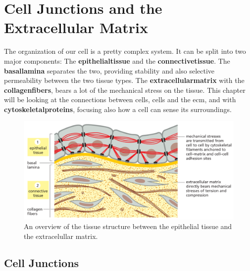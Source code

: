 \documentclass[../main.tex]{subfiles}
\begin{document}
	
\section{Cell Junctions and the Extracellular Matrix}

The organization of our cell is a pretty complex system. It can be split into two major components: The \textbf{\gls{epithelialtissue}} and the \textbf{\gls{connectivetissue}}. The \textbf{\gls{basallamina}} separates the two, providing stability and also selective permeability between the two tissue types. The \textbf{\gls{extracellularmatrix}} with the \textbf{\gls{collagenfibers}}, bears a lot of the mechanical stress on the tissue. This chapter will be looking at the connections between cells, cells and the ecm, and with \textbf{\gls{cytoskeletalproteins}}, focusing also how a cell can sense its surroundings.

\begin{figure}[H]
	\centering
	\includegraphics[width=0.7\linewidth]{tiss_overview}
	\caption{An overview of the tissue structure between the epithelial tissue and the extracelullar matrix.}
	\label{fig:tissoverview}
\end{figure}


\subsection{Cell Junctions}
\end{document}
